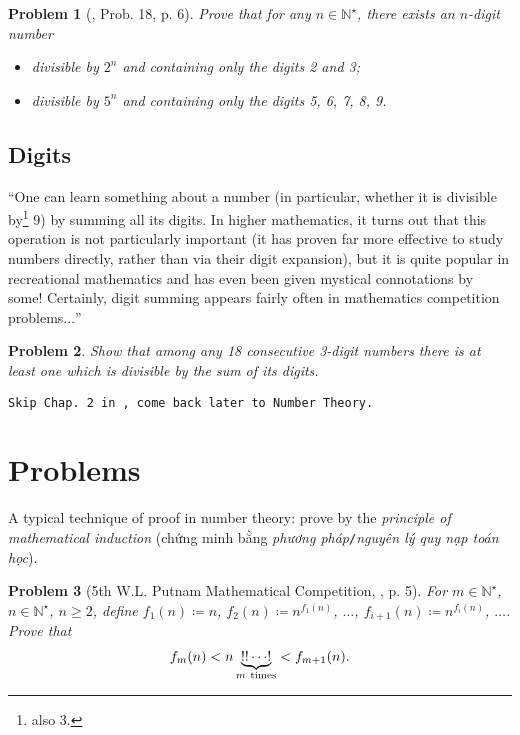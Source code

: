 \documentclass[oneside]{book}
\numberwithin{equation}{section}
\newtheorem{problem}{Problem}[section]
\begin{document}
\begin{problem}[\cite{Gelca_Andreescu2017}, Prob. 18, p. 6]
	Prove that for any $n\in\mathbb{N}^\star$, there exists an $n$-digit number
	\begin{itemize}
		\item[(a)] divisible by $2^n$ and containing only the digits 2 and 3;
		\item[(b)] divisible by $5^n$ and containing only the digits 5, 6, 7, 8, 9.
	\end{itemize}
\end{problem}

\subsection{Digits}
``One can learn something about a number (in particular, whether it is divisible by\footnote{also 3.} 9) by summing all its digits. In higher mathematics, it turns out that this operation is not particularly important (it has proven far more effective to study numbers directly, rather than
via their digit expansion), but it is quite popular in recreational mathematics and has even been given mystical connotations by some! Certainly, digit summing appears fairly often in mathematics competition problems$\ldots$''

\begin{problem}
	Show that among any 18 consecutive 3-digit numbers there is at least one which is divisible by the sum of its digits.
\end{problem}
\texttt{Skip Chap. 2 in \cite{Tao2006}, come back later to Number Theory.}

\section{Problems}
A typical technique of proof in number theory: prove by the \textit{principle of mathematical induction} (chứng minh bằng \textit{phương pháp}\texttt{/}\textit{nguyên lý quy nạp toán học}).

\begin{problem}[5th W.L. Putnam Mathematical Competition, \cite{Gelca_Andreescu2017}, p. 5]
	For $m\in\mathbb{N}^\star$, $n\in\mathbb{N}^\star$, $n\ge 2$, define $f_1(n)\coloneqq n$, $f_2(n)\coloneqq n^{f_1(n)}$, $\ldots$, $f_{i+1}(n)\coloneqq n^{f_i(n)}$, $\ldots$. Prove that
	\begin{align*}
		f_m(n) < n\underbrace{!!\cdots!}_{m\ {\rm times}} < f_{m+1}(n).
	\end{align*}
\end{problem}
\end{document}
